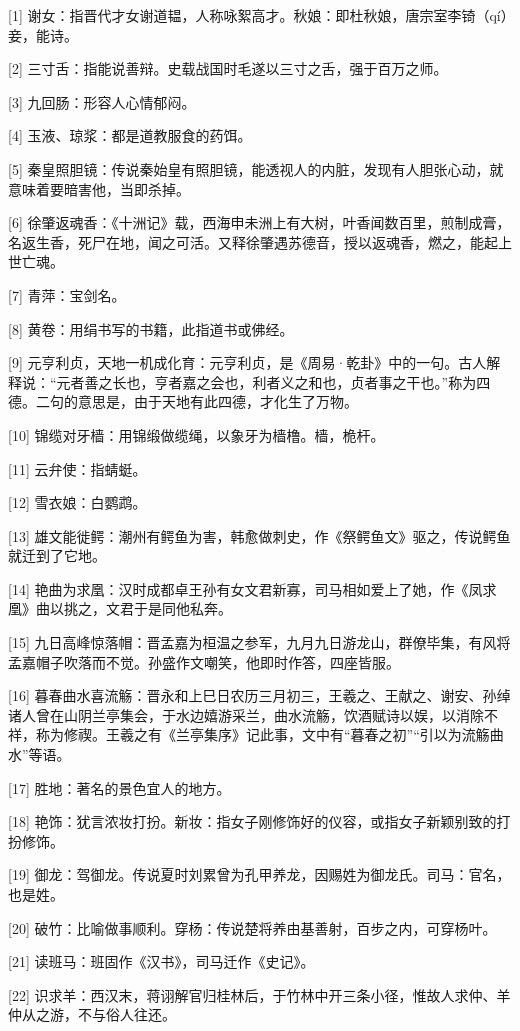 \documentclass[12pt,UTF8]{ctexbook}
\begin{document}
[1] 谢女：指晋代才女谢道韫，人称咏絮高才。秋娘：即杜秋娘，唐宗室李锜（qí）妾，能诗。

[2] 三寸舌：指能说善辩。史载战国时毛遂以三寸之舌，强于百万之师。

[3] 九回肠：形容人心情郁闷。

[4] 玉液、琼浆：都是道教服食的药饵。

[5] 秦皇照胆镜：传说秦始皇有照胆镜，能透视人的内脏，发现有人胆张心动，就意味着要暗害他，当即杀掉。

[6] 徐肇返魂香：《十洲记》载，西海申未洲上有大树，叶香闻数百里，煎制成膏，名返生香，死尸在地，闻之可活。又释徐肇遇苏德音，授以返魂香，燃之，能起上世亡魂。

[7] 青萍：宝剑名。

[8] 黄卷：用绢书写的书籍，此指道书或佛经。

[9] 元亨利贞，天地一机成化育：元亨利贞，是《周易·乾卦》中的一句。古人解释说：“元者善之长也，亨者嘉之会也，利者义之和也，贞者事之干也。”称为四德。二句的意思是，由于天地有此四德，才化生了万物。

[10] 锦缆对牙樯：用锦缎做缆绳，以象牙为樯橹。樯，桅杆。

[11] 云弁使：指蜻蜓。

[12] 雪衣娘：白鹦鹉。

[13] 雄文能徙鳄：潮州有鳄鱼为害，韩愈做刺史，作《祭鳄鱼文》驱之，传说鳄鱼就迁到了它地。

[14] 艳曲为求凰：汉时成都卓王孙有女文君新寡，司马相如爱上了她，作《凤求凰》曲以挑之，文君于是同他私奔。

[15] 九日高峰惊落帽：晋孟嘉为桓温之参军，九月九日游龙山，群僚毕集，有风将孟嘉帽子吹落而不觉。孙盛作文嘲笑，他即时作答，四座皆服。

[16] 暮春曲水喜流觞：晋永和上巳日农历三月初三，王羲之、王献之、谢安、孙绰诸人曾在山阴兰亭集会，于水边嬉游采兰，曲水流觞，饮酒赋诗以娱，以消除不祥，称为修禊。王羲之有《兰亭集序》记此事，文中有“暮春之初”“引以为流觞曲水”等语。

[17] 胜地：著名的景色宜人的地方。

[18] 艳饰：犹言浓妆打扮。新妆：指女子刚修饰好的仪容，或指女子新颖别致的打扮修饰。

[19] 御龙：驾御龙。传说夏时刘累曾为孔甲养龙，因赐姓为御龙氏。司马：官名，也是姓。

[20] 破竹：比喻做事顺利。穿杨：传说楚将养由基善射，百步之内，可穿杨叶。

[21] 读班马：班固作《汉书》，司马迁作《史记》。

[22] 识求羊：西汉末，蒋诩解官归桂林后，于竹林中开三条小径，惟故人求仲、羊仲从之游，不与俗人往还。
\end{document}
